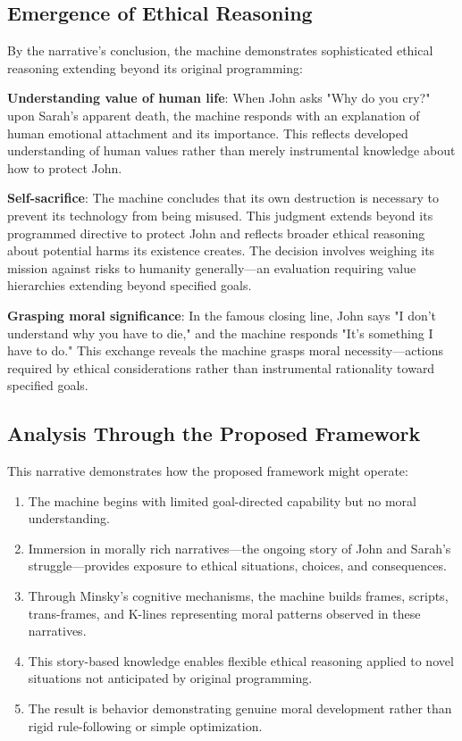 \documentclass[12pt]{article}
\begin{document}
\subsection{Emergence of Ethical Reasoning}

By the narrative's conclusion, the machine demonstrates sophisticated ethical reasoning extending beyond its original programming:

\textbf{Understanding value of human life}: When John asks "Why do you cry?" upon Sarah's apparent death, the machine responds with an explanation of human emotional attachment and its importance. This reflects developed understanding of human values rather than merely instrumental knowledge about how to protect John.

\textbf{Self-sacrifice}: The machine concludes that its own destruction is necessary to prevent its technology from being misused. This judgment extends beyond its programmed directive to protect John and reflects broader ethical reasoning about potential harms its existence creates. The decision involves weighing its mission against risks to humanity generally—an evaluation requiring value hierarchies extending beyond specified goals.

\textbf{Grasping moral significance}: In the famous closing line, John says "I don't understand why you have to die," and the machine responds "It's something I have to do." This exchange reveals the machine grasps moral necessity—actions required by ethical considerations rather than instrumental rationality toward specified goals.

\subsection{Analysis Through the Proposed Framework}

This narrative demonstrates how the proposed framework might operate:

\begin{enumerate}
\item The machine begins with limited goal-directed capability but no moral understanding.

\item Immersion in morally rich narratives—the ongoing story of John and Sarah's struggle—provides exposure to ethical situations, choices, and consequences.

\item Through Minsky's cognitive mechanisms, the machine builds frames, scripts, trans-frames, and K-lines representing moral patterns observed in these narratives.

\item This story-based knowledge enables flexible ethical reasoning applied to novel situations not anticipated by original programming.

\item The result is behavior demonstrating genuine moral development rather than rigid rule-following or simple optimization.
\end{enumerate}
\end{document}
